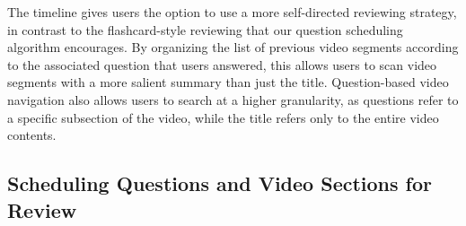 \documentclass{sigchi}
\begin{document}


The timeline gives users the option to use a more self-directed reviewing strategy, in contrast to the flashcard-style reviewing that our question scheduling algorithm encourages. By organizing the list of previous video segments according to the associated question that users answered, this allows users to scan video segments with a more salient summary than just the title. Question-based video navigation also allows users to search at a higher granularity, as questions refer to a specific subsection of the video, while the title refers only to the entire video contents. %

\subsection{Scheduling Questions and Video Sections for Review}
\end{document}
